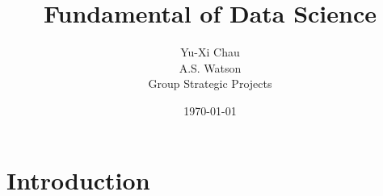 \documentclass[10pt, a4paper, titlepage]{article}
\title{Fundamental of Data Science}
\author{Yu-Xi Chau\\
	A.S. Watson\\
	Group Strategic Projects
	}
\date{\today}
\begin{document}
\maketitle

\tableofcontents %
\newpage

\section{Introduction}


\newpage 










\end{document}
